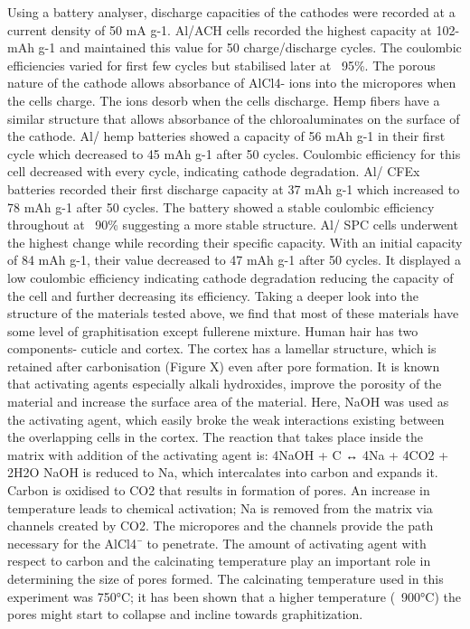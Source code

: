 \documentclass{article}
\begin{document}
Using a battery analyser, discharge capacities of the cathodes were recorded at a current density of 50 mA g-1. Al/ACH cells recorded the highest capacity at 102-mAh g-1 and maintained this value for 50 charge/discharge cycles. The coulombic efficiencies varied for first few cycles but stabilised later at ~95\%. The porous nature of the cathode allows absorbance of AlCl4- ions into the micropores when the cells charge. The ions desorb when the cells discharge. Hemp fibers have a similar structure that allows absorbance of the chloroaluminates on the surface of the cathode. Al/ hemp batteries showed a capacity of 56 mAh g-1 in their first cycle which decreased to 45 mAh g-1 after 50 cycles. Coulombic efficiency for this cell decreased with every cycle, indicating cathode degradation. Al/ CFEx batteries recorded their first discharge capacity at 37 mAh g-1 which increased to 78 mAh g-1 after 50 cycles. The battery showed a stable coulombic efficiency throughout at ~90\% suggesting a more stable structure. Al/ SPC cells underwent the highest change while recording their specific capacity. With an initial capacity of 84 mAh g-1, their value decreased to 47 mAh g-1 after 50 cycles.  It displayed a low coulombic efficiency indicating cathode degradation reducing the capacity of the cell and further decreasing its efficiency. 
Taking a deeper look into the structure of the materials tested above, we find that most of these materials have some level of graphitisation except fullerene mixture. Human hair has two components- cuticle and cortex. The cortex has a lamellar structure, which is retained after carbonisation (Figure X) even after pore formation. It is known that activating agents especially alkali hydroxides, improve the porosity of the material and increase the surface area of the material. Here, NaOH was used as the activating agent, which easily broke the weak interactions existing between the overlapping cells in the cortex. The reaction that takes place inside the matrix with addition of the activating agent is:
4NaOH + C ↔ 4Na + 4CO2 + 2H2O
NaOH is reduced to Na, which intercalates into carbon and expands it. Carbon is oxidised to CO2 that results in formation of pores. An increase in temperature leads to chemical activation; Na is removed from the matrix via channels created by CO2. The micropores and the channels provide the path necessary for the AlCl4¯ to penetrate. The amount of activating agent with respect to carbon and the calcinating temperature play an important role in determining the size of pores formed. The calcinating temperature used in this experiment was 750°C; it has been shown that a higher temperature (~900°C) the pores might start to collapse and incline towards graphitization. 
\end{document}
